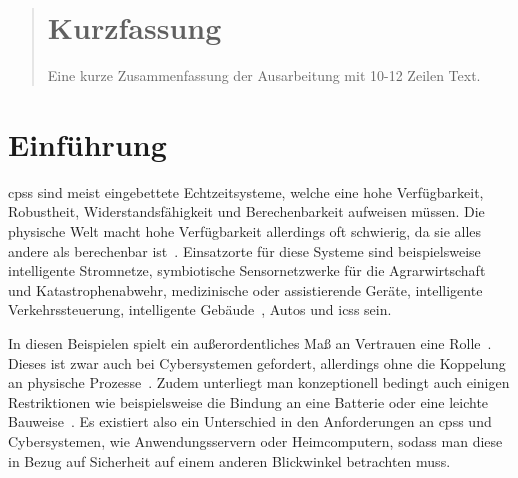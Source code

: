\documentclass[final,bibliography=totocnumbered]{include/sikseminar}
\newcommand{\cps}{\glspl{cps}\xspace}
\begin{document}
\makeTitle

\makeAuthor
\date{Datum des Vortrags \todo}
\subject{Seminar Cyber-Physical Systems}

\maketitle

\begin{abstract}
\section*{Kurzfassung}
Eine kurze Zusammenfassung der Ausarbeitung mit 10-12 Zeilen Text.
\end{abstract}
\thispagestyle{empty}
\newpage
\tableofcontents
\newpage

\section{Einführung}\label{sec:intro}
\cps sind meist eingebettete Echtzeitsysteme, welche eine hohe Verfügbarkeit, Robustheit, Widerstandsfähigkeit und Berechenbarkeit aufweisen müssen.
Die physische Welt macht hohe Verfügbarkeit allerdings oft schwierig, da sie alles andere als berechenbar ist~\cite{Lee08,SGL+08}.
Einsatzorte für diese Systeme sind beispielsweise intelligente Stromnetze, symbiotische Sensornetzwerke für die Agrarwirtschaft und Katastrophenabwehr, medizinische oder assistierende Geräte, intelligente Verkehrssteuerung, intelligente Gebäude~\cite{RLS+10}, Autos und \glspl{ics} sein.

In diesen Beispielen spielt ein außerordentliches Maß an Vertrauen eine Rolle~\cite{SGL+08}.
Dieses ist zwar auch bei Cybersystemen gefordert, allerdings ohne die Koppelung an physische Prozesse~\cite{BG11}.
Zudem unterliegt man konzeptionell bedingt auch einigen Restriktionen wie beispielsweise die Bindung an eine Batterie oder eine leichte Bauweise~\cite{YWY+17}.
Es existiert also ein Unterschied in den Anforderungen an \cps und Cybersystemen, wie Anwendungsservern oder Heimcomputern, sodass man diese in Bezug auf Sicherheit auf einem anderen Blickwinkel betrachten muss.
\end{document}
